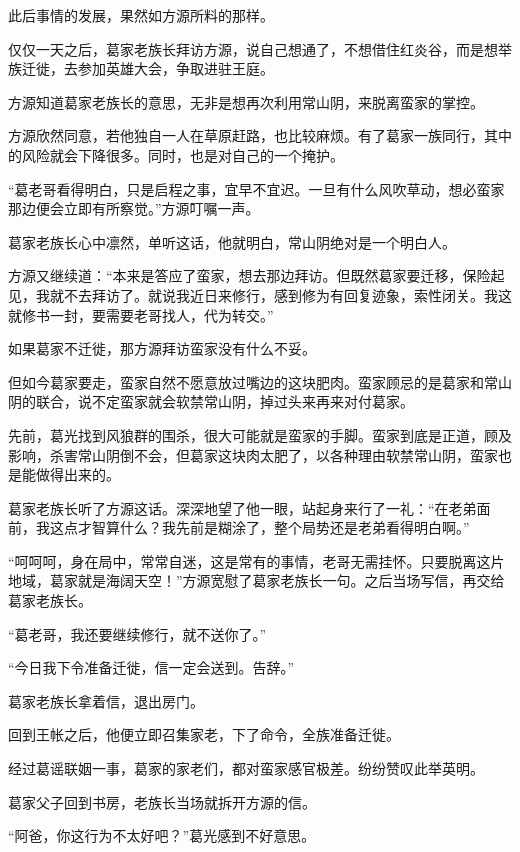 
\begin{this_body}

此后事情的发展，果然如方源所料的那样。

仅仅一天之后，葛家老族长拜访方源，说自己想通了，不想借住红炎谷，而是想举族迁徙，去参加英雄大会，争取进驻王庭。

方源知道葛家老族长的意思，无非是想再次利用常山阴，来脱离蛮家的掌控。

方源欣然同意，若他独自一人在草原赶路，也比较麻烦。有了葛家一族同行，其中的风险就会下降很多。同时，也是对自己的一个掩护。

“葛老哥看得明白，只是启程之事，宜早不宜迟。一旦有什么风吹草动，想必蛮家那边便会立即有所察觉。”方源叮嘱一声。

葛家老族长心中凛然，单听这话，他就明白，常山阴绝对是一个明白人。

方源又继续道：“本来是答应了蛮家，想去那边拜访。但既然葛家要迁移，保险起见，我就不去拜访了。就说我近日来修行，感到修为有回复迹象，索性闭关。我这就修书一封，要需要老哥找人，代为转交。”

如果葛家不迁徙，那方源拜访蛮家没有什么不妥。

但如今葛家要走，蛮家自然不愿意放过嘴边的这块肥肉。蛮家顾忌的是葛家和常山阴的联合，说不定蛮家就会软禁常山阴，掉过头来再来对付葛家。

先前，葛光找到风狼群的围杀，很大可能就是蛮家的手脚。蛮家到底是正道，顾及影响，杀害常山阴倒不会，但葛家这块肉太肥了，以各种理由软禁常山阴，蛮家也是能做得出来的。

葛家老族长听了方源这话。深深地望了他一眼，站起身来行了一礼：“在老弟面前，我这点才智算什么？我先前是糊涂了，整个局势还是老弟看得明白啊。”

“呵呵呵，身在局中，常常自迷，这是常有的事情，老哥无需挂怀。只要脱离这片地域，葛家就是海阔天空！”方源宽慰了葛家老族长一句。之后当场写信，再交给葛家老族长。

“葛老哥，我还要继续修行，就不送你了。”

“今日我下令准备迁徙，信一定会送到。告辞。”

葛家老族长拿着信，退出房门。

回到王帐之后，他便立即召集家老，下了命令，全族准备迁徙。

经过葛谣联姻一事，葛家的家老们，都对蛮家感官极差。纷纷赞叹此举英明。

葛家父子回到书房，老族长当场就拆开方源的信。

“阿爸，你这行为不太好吧？”葛光感到不好意思。


\end{this_body}
